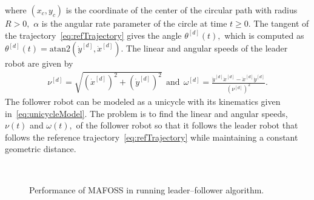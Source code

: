 %
where $(x_c,y_c)$ is the coordinate of the center of the circular path with radius $R>0,$ $\alpha$ is the angular rate parameter of the circle at time $t\ge 0.$ The tangent of the trajectory~\eqref{eq:refTrajectory} gives the angle $\theta^{[d]}(t),$ which is computed as $\theta^{[d]}(t) = \mathrm{atan2}(\dot y^{[d]},\dot x^{[d]}).$  The  linear and angular speeds of the leader robot are given by %
%
\begin{align*}
  \nu^{[d]} = \sqrt{(\dot x^{[d]})^2 + (\dot y^{[d]})^2}~~\text{and}~~
  \omega^{[d]}  = \frac{\ddot y^{[d]} \dot x^{[d]}-\ddot x^{[d]} \dot y^{[d]}}{(\nu^{[d]})^2}.
\end{align*}
%
The follower robot can be  modeled as a unicycle with its kinematics given in~\eqref{eq:unicycleModel}. The problem is to find the linear and angular speeds, $\nu(t)$ and $\omega(t),$ of the follower robot so that it follows the leader robot that follows the reference trajectory~\eqref{eq:refTrajectory} while maintaining a constant geometric distance. %
%
\begin{figure}
    \centering
    \\
    \caption{Performance of MAFOSS in running leader--follower algorithm.}
    \label{fig:performanceLeaderFollower}
\end{figure}
